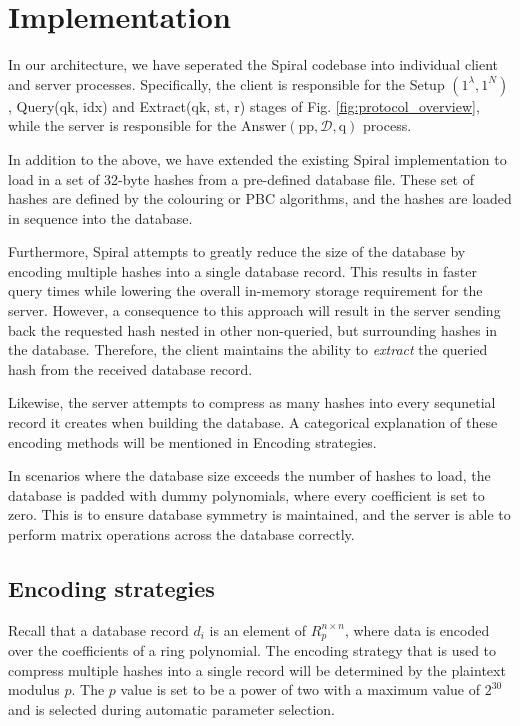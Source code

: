 \section{Implementation}

In our architecture, we have seperated the Spiral codebase into individual client and
server processes. Specifically, the client is responsible for the Setup
$\left(1^{\lambda}, 1^{N}\right)$, Query(qk, idx) and Extract(qk, st, r) stages of Fig.
\ref{fig:protocol_overview}, while the server is responsible for the Answer$(\mathrm{pp},
\mathcal{D}, \mathrm{q})$ process.

In addition to the above, we have extended the existing Spiral implementation to load in
a set of 32-byte hashes from a pre-defined database file. These set of hashes
are defined by the colouring or PBC algorithms, and the hashes are loaded in sequence into
the database.

Furthermore, Spiral attempts to greatly reduce the size of the database by encoding
multiple hashes into a single database record. This results in faster query times while
lowering the overall in-memory storage requirement for the server. However, a consequence
to this approach will result in the server sending back the requested hash nested in other
non-queried, but surrounding hashes in the database. Therefore, the client maintains the
ability to \textit{extract} the queried hash from the received database record.

Likewise, the server attempts to compress as many hashes into every sequnetial record it
creates when building the database. A categorical explanation of these encoding methods
will be mentioned in Encoding strategies.

In scenarios where the database size exceeds the number of hashes to load, the database is
padded with dummy polynomials, where every coefficient is set to zero. This is to ensure
database symmetry is maintained, and the server is able to perform matrix operations
across the database correctly.

\subsection{Encoding strategies}

Recall that a database record $d_{i}$ is an element of $R_{p}^{n \times n}$, where data is
encoded over the coefficients of a ring polynomial. The encoding strategy that is used to compress
multiple hashes into a single record will be determined by the plaintext modulus $p$. The $p$ value is set
to be a power of two with a maximum value of $2^{30}$ and is selected during automatic
parameter selection\cite{1}.

